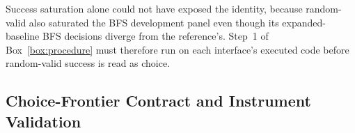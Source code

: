 Success saturation alone could not have exposed the identity, because random-valid also saturated the BFS development panel even though its expanded-baseline BFS decisions diverge from the reference's. Step~1 of Box~\ref{box:procedure} must therefore run on each interface's executed code before random-valid success is read as choice.

\subsection{Choice-Frontier Contract and Instrument Validation}
\label{sec:results-ladder}
\label{sec:results-choice-frontier}

